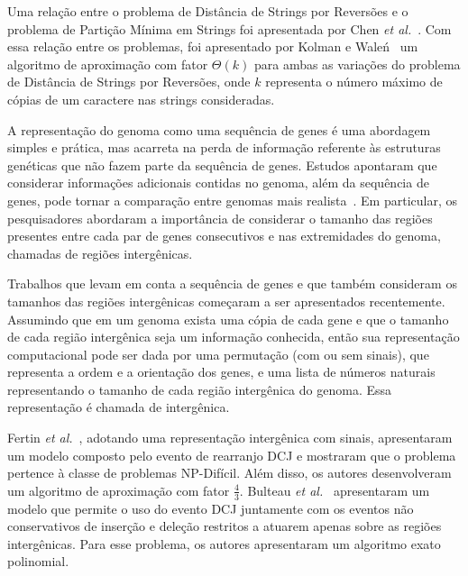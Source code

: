 Uma relação entre o problema de Distância de Strings por Reversões e o problema de Partição Mínima em Strings foi apresentada por Chen \textit{et al.}~\cite{2005-chen-etal}. Com essa relação entre os problemas, foi apresentado por Kolman e Wale{\'n}~\cite{2006-kolman-walen} um algoritmo de aproximação com fator $\Theta(k)$ para ambas as variações do problema de Distância de Strings por Reversões, onde $k$ representa o número máximo de cópias de um caractere nas strings consideradas.

A representação do genoma como uma sequência de genes é uma abordagem simples e prática, mas acarreta na perda de informação referente às estruturas genéticas que não fazem parte da sequência de genes. Estudos apontaram que considerar informações adicionais contidas no genoma, além da sequência de genes, pode tornar a comparação entre genomas mais realista~\cite{2016a-biller-etal, 2016b-biller-etal}. Em particular, os pesquisadores abordaram a importância de considerar o tamanho das regiões presentes entre cada par de genes consecutivos e nas extremidades do genoma, chamadas de regiões intergênicas. 

Trabalhos que levam em conta a sequência de genes e que também consideram os tamanhos das regiões intergênicas começaram a ser apresentados recentemente. Assumindo que em um genoma exista uma cópia de cada gene e que o tamanho de cada região intergênica seja um informação conhecida, então sua representação computacional pode ser dada por uma permutação (com ou sem sinais), que representa a ordem e a orientação dos genes, e uma lista de números naturais representando o tamanho de cada região intergênica do genoma. Essa representação é chamada de intergênica.

Fertin \textit{et al.}~\cite{2017-fertin-etal}, adotando uma representação intergênica com sinais, apresentaram um modelo composto pelo evento de rearranjo DCJ e mostraram que o problema pertence à classe de problemas NP-Difícil. Além disso, os autores desenvolveram um algoritmo de aproximação com fator $\frac{4}{3}$. Bulteau \textit{et al.}~\cite{2016b-bulteau-etal} apresentaram um modelo que permite o uso do evento DCJ juntamente com os eventos não conservativos de inserção e deleção restritos a atuarem apenas sobre as regiões intergênicas. Para esse problema, os autores apresentaram um algoritmo exato polinomial. 

